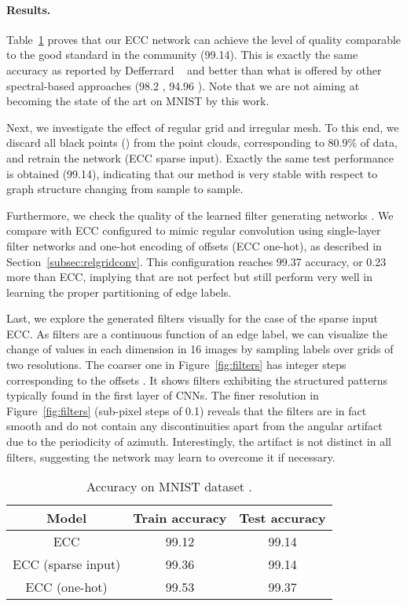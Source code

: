 \documentclass[10pt,twocolumn,letterpaper]{article}
\begin{document}
\paragraph*{Results.} Table~\ref{tab:resmnist} proves that our ECC network can achieve the level of quality comparable to the good standard in the community (99.14). This is exactly the same accuracy as reported by Defferrard \etal~\cite{defferrard16} and better than what is offered by other spectral-based approaches (98.2 \cite{bruna13}, 94.96 \cite{edwards16}). Note that we are not aiming at becoming the state of the art on MNIST by this work. 

Next, we investigate the effect of regular grid and irregular mesh. To this end, we discard all black points () from the point clouds, corresponding to 80.9\% of data, and retrain the network (ECC sparse input). Exactly the same test performance is obtained (99.14), indicating that our method is very stable with respect to graph structure changing from sample to sample.

Furthermore, we check the quality of the learned filter generating networks . We compare with ECC configured to mimic regular convolution using single-layer filter networks and one-hot encoding of offsets (ECC one-hot), as described in Section~\ref{subsec:relgridconv}. This configuration reaches 99.37 accuracy, or 0.23 more than ECC, implying that  are not perfect but still perform very well in learning the proper partitioning of edge labels.

Last, we explore the generated filters visually for the case of the sparse input ECC. As filters  are a continuous function of an edge label, we can visualize the change of values in each dimension in 16 images by sampling labels over grids of two resolutions. The coarser one in Figure~\ref{fig:filters} has integer steps corresponding to the offsets . It shows filters exhibiting the structured patterns typically found in the first layer of CNNs. The finer resolution in Figure~\ref{fig:filters} (sub-pixel steps of 0.1) reveals that the filters are in fact smooth and do not contain any discontinuities apart from the angular artifact due to the  periodicity of azimuth. Interestingly, the artifact is not distinct in all filters, suggesting the network may learn to overcome it if necessary. 


\begin{table}[bt]
\centering
\begin{tabular}{ccc}
\toprule
Model & Train accuracy & Test accuracy\tabularnewline
\midrule
ECC & 99.12 & 99.14 \tabularnewline
ECC (sparse input) & 99.36 & 99.14 \tabularnewline
ECC (one-hot) & 99.53 & 99.37\tabularnewline
\bottomrule
\end{tabular}
\vspace{1.5ex}
\caption{\label{tab:resmnist} Accuracy on MNIST dataset \cite{mnist}.}
\end{table}
\end{document}
